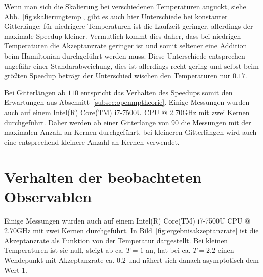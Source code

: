 	Wenn man sich die Skalierung bei verschiedenen Temperaturen anguckt, siehe Abb.~\ref{fig:skalierungtemp}, gibt es auch hier Unterschiede bei konstanter Gitterlänge: für niedrigere Temperaturen ist die Laufzeit geringer, allerdings der maximale Speedup kleiner. Vermutlich kommt dies daher, dass bei niedrigen Temperaturen die Akzeptanzrate geringer ist und somit seltener eine Addition beim Hamiltonian durchgeführt werden muss. Diese Unterschiede entsprechen ungefähr einer Standarabweichung, dies ist allerdings recht gering und selbst beim größten Speedup beträgt der Unterschied wischen den Temperaturen nur $\num{0,17}$.
	
	Bei Gitterlängen ab $110$ entspricht das Verhalten des Speedups somit den Erwartungen aus Abschnitt~\ref{subsec:openmptheorie}. Einige Messungen wurden auch auf einem Intel(R) Core(TM) i7-7500U CPU @ 2.70GHz mit zwei Kernen durchgeführt.
	Daher werden ab einer Gitterlänge von 90 die Messungen mit der maximalen Anzahl an Kernen durchgeführt, bei kleineren Gitterlängen wird auch eine entsprechend kleinere Anzahl an Kernen verwendet. 
	
	
	
	
	\section{Verhalten der beobachteten Observablen}
	\label{sec:ergebnisobservablen}
	
	Einige Messungen wurden auch auf einem Intel(R) Core(TM) i7-7500U CPU @ 2.70GHz mit zwei Kernen durchgeführt. 
	In Bild~\ref{fig:ergebnisakzeptanzrate} ist die Akzeptanzrate als Funktion von der Temperatur dargestellt. Bei kleinen Temperaturen ist sie null, steigt ab ca. $T=1$ an, hat bei ca. $T=\num{2,2}$ einen Wendepunkt mit Akzeptanzrate ca. $\num{0,2}$ und nähert sich danach asymptotisch dem Wert $1$. 
	
